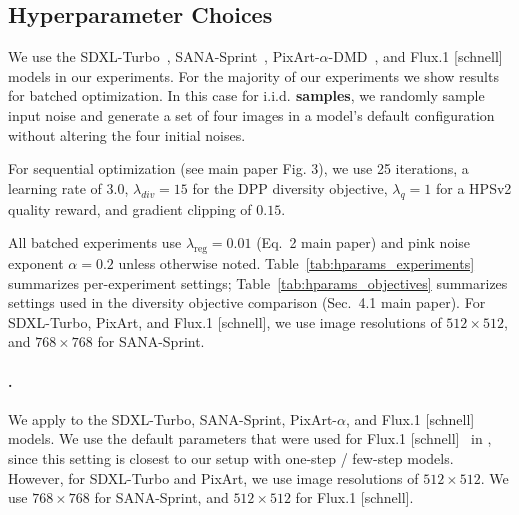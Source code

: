 \documentclass[10pt,twocolumn,letterpaper]{article}
\begin{document}
\subsection{Hyperparameter Choices}\label{sec:supp_hyperparams}
We use the SDXL-Turbo~\cite{sdxlturbo}, SANA-Sprint~\cite{sanasprint}, PixArt-$\alpha$-DMD~\cite{pixartalpha}, and Flux.1 [schnell]~\cite{flux} models in our experiments. For the majority of our experiments we show results for batched optimization. In this case for \textbf{$\text{i.i.d.}$ samples}, we randomly sample input noise and generate a set of four images in a model's default configuration without altering the four initial noises.

For sequential optimization (see main paper Fig. 3), we use 25 iterations, a learning rate of $3.0$, $\lambda_{div}=15$ for the DPP diversity objective, $\lambda_{q}=1$ for a HPSv2 quality reward, and gradient clipping of $0.15$.

All batched experiments use $\lambda_{\text{reg}} = 0.01$ (Eq.~2 main paper) and pink noise 
exponent $\alpha = 0.2$ unless otherwise noted. Table~\ref{tab:hparams_experiments} 
summarizes per-experiment settings; Table~\ref{tab:hparams_objectives} summarizes 
settings used in the diversity objective comparison (Sec.~4.1 main paper). For SDXL-Turbo, PixArt, and Flux.1 [schnell], we use image resolutions of $512 \times 512$, and $768 \times 768$ for SANA-Sprint. 

\paragraph{\citet{gi}.} We apply \cite{gi} to the SDXL-Turbo, SANA-Sprint, PixArt-$\alpha$, and Flux.1 [schnell] models. We use the default parameters that were used for Flux.1 [schnell]~\cite{flux,flux_url} in \cite{gi}, since this setting is closest to our setup with one-step / few-step models. However, for SDXL-Turbo and PixArt, we use image resolutions of $512 \times 512$. We use $768 \times 768$ for SANA-Sprint, and $512 \times 512$ for Flux.1 [schnell]. 
\end{document}
